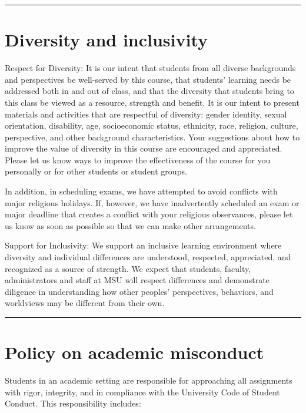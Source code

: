 \documentclass[
]{article}
\begin{document}
\begin{center}\rule{0.5\linewidth}{0.5pt}\end{center}

\section{Diversity and inclusivity}\label{diversity-and-inclusivity}

Respect for Diversity: It is our intent that students from all diverse
backgrounds and perspectives be well-served by this course, that
students' learning needs be addressed both in and out of class, and that
the diversity that students bring to this class be viewed as a resource,
strength and benefit. It is our intent to present materials and
activities that are respectful of diversity: gender identity, sexual
orientation, disability, age, socioeconomic status, ethnicity, race,
religion, culture, perspective, and other background characteristics.
Your suggestions about how to improve the value of diversity in this
course are encouraged and appreciated. Please let us know ways to
improve the effectiveness of the course for you personally or for other
students or student groups.

In addition, in scheduling exams, we have attempted to avoid conflicts
with major religious holidays. If, however, we have inadvertently
scheduled an exam or major deadline that creates a conflict with your
religious observances, please let us know as soon as possible so that we
can make other arrangements.

Support for Inclusivity: We support an inclusive learning environment
where diversity and individual differences are understood, respected,
appreciated, and recognized as a source of strength. We expect that
students, faculty, administrators and staff at MSU will respect
differences and demonstrate diligence in understanding how other
peoples' perspectives, behaviors, and worldviews may be different from
their own.

\begin{center}\rule{0.5\linewidth}{0.5pt}\end{center}

\section{Policy on academic
misconduct}\label{policy-on-academic-misconduct}

Students in an academic setting are responsible for approaching all
assignments with rigor, integrity, and in compliance with the University
Code of Student Conduct. This responsibility includes:
\end{document}
